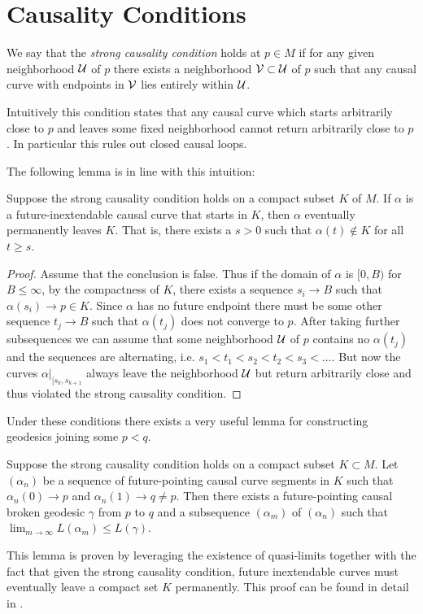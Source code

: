 \section{Causality Conditions}

\begin{definition}\label{def:scc}
We say that the \emph{strong causality condition} holds at $p\in M$ if for any given neighborhood $\mathcal{U}$ of $p$ there exists a neighborhood $\mathcal{V} \subset \mathcal{U}$ of $p$ such that any causal curve with endpoints in $\mathcal{V}$ lies entirely within $\mathcal{U}$.
\end{definition}
Intuitively this condition states that any causal curve which starts arbitrarily close to $p$ and leaves some fixed neighborhood cannot return arbitrarily close to $p$. In particular this rules out closed causal loops.

The following lemma is in line with this intuition:
\begin{lemma}\label{lem:leavescompact}
Suppose the strong causality condition holds on a compact subset $K$ of $M$. If $\alpha$ is a future-inextendable causal curve that starts in $K$, then $\alpha$ eventually permanently leaves $K$. That is, there exists a $s>0$ such that $\alpha(t)\notin K$ for all $t\geq s$.
\end{lemma}
\begin{proof}
Assume that the conclusion is false. Thus if the domain of $\alpha$ is $[0,B)$ for $B\leq \infty$, by the compactness of $K$, there exists a sequence $s_i\to B$ such that $\alpha(s_i)\to p\in K$. Since $\alpha$ has no future endpoint there must be some other sequence $t_j\to B$ such that $\alpha(t_j)$ does not converge to $p$. After taking further subsequences we can assume that some neighborhood $\mathcal{U}$ of $p$ contains no $\alpha(t_j)$ and the sequences are alternating, i.e. $s_1<t_1<s_2<t_2<s_3<\dots$. But now the curves $\alpha\rvert_{[s_k,s_{k+1}}$ always leave the neighborhood $\mathcal{U}$ but return arbitrarily close and thus violated the strong causality condition.
\end{proof}

Under these conditions there exists a very useful lemma for constructing geodesics joining some $p<q$.
\begin{lemma}\label{lem:geodconstr}
Suppose the strong causality condition holds on a compact subset $K\subset M$. Let $(\alpha_n)$ be a sequence of future-pointing causal curve segments in $K$ such that $\alpha_n(0) \to p$ and $\alpha_n(1)\to q\neq p$. Then there exists a future-pointing causal broken geodesic $\gamma$ from $p$ to $q$ and a subsequence $(\alpha_m)$ of $(\alpha_n)$ such that $\lim_{m\to\infty} L(\alpha_m) \leq L(\gamma)$.
\end{lemma}
This lemma is proven by leveraging the existence of quasi-limits together with the fact that given the strong causality condition, future inextendable curves must eventually leave a compact set $K$ permanently. This proof can be found in detail in \cite[Lemma 14.14]{oneill}.

